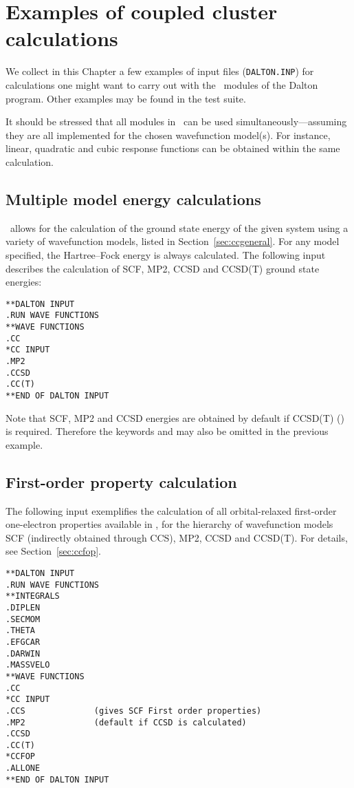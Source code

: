 \chapter{Examples of coupled cluster calculations}
\label{ch:ccexamples}

We collect in this Chapter a few examples of input files (\verb|DALTON.INP|) 
for calculations one might want to carry 
out with the \cc\ modules of the Dalton program.
Other examples may be found in the test suite. 

It should be stressed that %
all modules in \cc \ can be used 
simultaneously---assuming they are all implemented
for the chosen wavefunction model(s).
For instance,  linear, quadratic and cubic response functions 
can be obtained within the same calculation.

\section{Multiple model energy calculations}
%
\cc\  allows for the calculation of the ground state energy
of the given system using a variety of wavefunction models, listed in 
Section~\ref{sec:ccgeneral}. 
For any model specified, the Hartree--Fock energy is always calculated. 
The following input describes the calculation of SCF, MP2, CCSD and 
CCSD(T) ground state energies:
%
\begin{verbatim}
**DALTON INPUT
.RUN WAVE FUNCTIONS
**WAVE FUNCTIONS
.CC
*CC INPUT
.MP2              
.CCSD
.CC(T)
**END OF DALTON INPUT
\end{verbatim}
Note that SCF, MP2 and CCSD energies are obtained by default if 
CCSD(T) () is required. Therefore the 
keywords  and 
may also be omitted in the previous example.

\section{First-order property calculation}

The following input exemplifies the calculation of all orbital-relaxed
first-order one-electron properties available in \cc, for the hierarchy of 
wavefunction models SCF (indirectly obtained through CCS), MP2, CCSD and CCSD(T).
For details, see Section~\ref{sec:ccfop}.
\begin{verbatim}
**DALTON INPUT
.RUN WAVE FUNCTIONS
**INTEGRALS
.DIPLEN
.SECMOM
.THETA
.EFGCAR
.DARWIN
.MASSVELO
**WAVE FUNCTIONS
.CC
*CC INPUT
.CCS              (gives SCF First order properties)
.MP2              (default if CCSD is calculated)
.CCSD
.CC(T)
*CCFOP
.ALLONE
**END OF DALTON INPUT
\end{verbatim}

